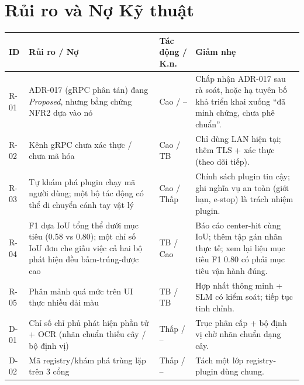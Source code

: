 \documentclass[11pt,a4paper]{report}
\begin{document}
\chapter{Rủi ro và Nợ Kỹ thuật}
\begin{longtable}{@{}p{1.2cm}p{5.0cm}p{2.0cm}p{5.6cm}@{}}
\toprule
\textbf{ID} & \textbf{Rủi ro / Nợ} & \textbf{Tác động / K.n.} & \textbf{Giảm nhẹ} \\
\midrule
\endhead
R-01 & ADR-017 (gRPC phân tán) đang \emph{Proposed}, nhưng bằng chứng NFR2 dựa vào nó & Cao / -- & Chấp nhận ADR-017 sau rà soát, hoặc hạ tuyên bố khả triển khai xuống ``đã minh chứng, chưa phê chuẩn''. \\
R-02 & Kênh gRPC chưa xác thực / chưa mã hóa & Cao / TB & Chỉ dùng LAN hiện tại; thêm TLS + xác thực (theo dõi tiếp). \\
R-03 & Tự khám phá plugin chạy mã người dùng; một bộ tác động có thể di chuyển cánh tay vật lý & Cao / Thấp & Chính sách plugin tin cậy; ghi nghĩa vụ an toàn (giới hạn, e-stop) là trách nhiệm plugin. \\
R-04 & F1 dựa IoU tổng thể dưới mục tiêu (0.58 vs 0.80); một chỉ số IoU đơn che giấu việc cả hai bộ phát hiện đều bấm-trúng-được cao & TB / Cao & Báo cáo center-hit cùng IoU; thêm tập gán nhãn thực tế; xem lại liệu mục tiêu F1 0.80 có phải mục tiêu vận hành đúng. \\
R-05 & Phân mảnh quá mức trên UI thực nhiều dải màu & TB / TB & Hợp nhất thông minh + SLM có kiểm soát; tiếp tục tinh chỉnh. \\
D-01 & Chỉ số chỉ phủ phát hiện phần tử + OCR (nhãn chuẩn thiếu cây / bộ định vị) & Thấp / -- & Trục phân cấp + bộ định vị chờ nhãn chuẩn dạng cây. \\
D-02 & Mã registry/khám phá trùng lặp trên 3 cổng & Thấp / -- & Tách một lớp registry-plugin dùng chung. \\
\bottomrule
\end{longtable}
\end{document}
